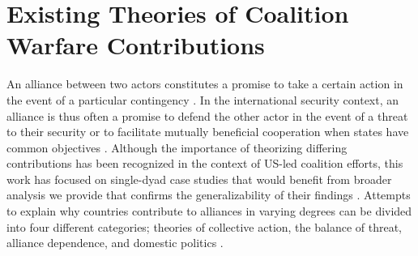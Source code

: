 \documentclass[12pt,letterpaper]{article}
\begin{document}
\section{Existing Theories of Coalition Warfare Contributions}
	An alliance between two actors constitutes a promise to take a certain action in the event of a particular contingency \citep[526]{altfeld_decisionallytheory_1984}. In the international security context, an alliance is thus often a promise to defend the other actor in the event of a threat to their security \citep{waltz_theoryinternationalpolitics_1979, walt_originsalliance_1987} or to facilitate mutually beneficial cooperation when states have common objectives \citep{keohane_hegemonycooperationdiscord_1984, wolford_showing_2014}. Although the importance of theorizing differing contributions has been recognized in the context of US-led coalition efforts, this work has focused on single-dyad case studies that would benefit from broader analysis we provide that confirms the generalizability of their findings \citep[4-5]{mello_politicsmultinationalmilitary_2018}. Attempts to explain why countries contribute to alliances in varying degrees can be divided into four different categories; theories of collective action, the balance of threat, alliance dependence, and domestic politics \citep{bennett_burdensharingpersiangulf_1994, haesebrouck_democraticparticipationair_2016}.
	
\end{document}
